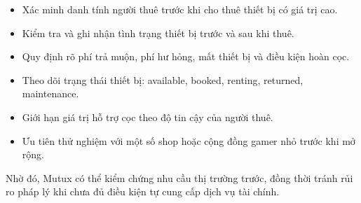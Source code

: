\begin{itemize}
    \item Xác minh danh tính người thuê trước khi cho thuê thiết bị có giá trị cao.
    \item Kiểm tra và ghi nhận tình trạng thiết bị trước và sau khi thuê.
    \item Quy định rõ phí trả muộn, phí hư hỏng, mất thiết bị và điều kiện hoàn cọc.
    \item Theo dõi trạng thái thiết bị: available, booked, renting, returned, maintenance.
    \item Giới hạn giá trị hỗ trợ cọc theo độ tin cậy của người thuê.
    \item Ưu tiên thử nghiệm với một số shop hoặc cộng đồng gamer nhỏ trước khi mở rộng.
\end{itemize}

Nhờ đó, Mutux có thể kiểm chứng nhu cầu thị trường trước, đồng thời tránh rủi ro pháp lý khi chưa đủ điều kiện tự cung cấp dịch vụ tài chính.
